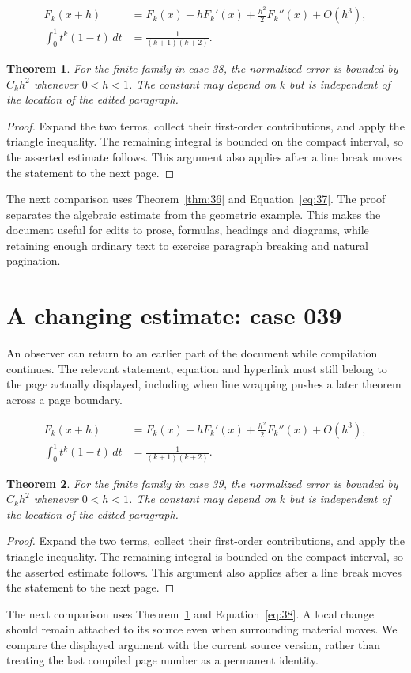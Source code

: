 \documentclass[a4paper,10pt]{article}
\newtheorem{theorem}{Theorem}[section]
\begin{document}
\lipsum[22-23]
\begin{align}\label{eq:37}
 F_k(x+h)&=F_k(x)+hF_k'(x)+\frac{h^2}{2}F_k''(x)+O(h^3),\\
 \int_0^1 t^k(1-t)\,dt&=\frac{1}{(k+1)(k+2)}.
\end{align}
\begin{theorem}\label{thm:37}
For the finite family in case 38, the normalized error is bounded by $C_k h^2$ whenever $0<h<1$. The constant may depend on $k$ but is independent of the location of the edited paragraph.
\end{theorem}
\begin{proof}
Expand the two terms, collect their first-order contributions, and apply the
triangle inequality. The remaining integral is bounded on the compact interval,
so the asserted estimate follows. This argument also applies after a line break
moves the statement to the next page.
\end{proof}
The next comparison uses Theorem~\ref{thm:36} and Equation~\ref{eq:37}. The proof separates the algebraic estimate from the geometric example. This makes the document useful for edits to prose, formulas, headings and diagrams, while retaining enough ordinary text to exercise paragraph breaking and natural pagination.

\lipsum[13]

\section{A changing estimate: case 039}\label{unit:38}
An observer can return to an earlier part of the document while compilation continues. The relevant statement, equation and hyperlink must still belong to the page actually displayed, including when line wrapping pushes a later theorem across a page boundary.

\lipsum[25-26]
\begin{align}\label{eq:38}
 F_k(x+h)&=F_k(x)+hF_k'(x)+\frac{h^2}{2}F_k''(x)+O(h^3),\\
 \int_0^1 t^k(1-t)\,dt&=\frac{1}{(k+1)(k+2)}.
\end{align}
\begin{theorem}\label{thm:38}
For the finite family in case 39, the normalized error is bounded by $C_k h^2$ whenever $0<h<1$. The constant may depend on $k$ but is independent of the location of the edited paragraph.
\end{theorem}
\begin{proof}
Expand the two terms, collect their first-order contributions, and apply the
triangle inequality. The remaining integral is bounded on the compact interval,
so the asserted estimate follows. This argument also applies after a line break
moves the statement to the next page.
\end{proof}
The next comparison uses Theorem~\ref{thm:37} and Equation~\ref{eq:38}. A local change should remain attached to its source even when surrounding material moves. We compare the displayed argument with the current source version, rather than treating the last compiled page number as a permanent identity.
\end{document}

